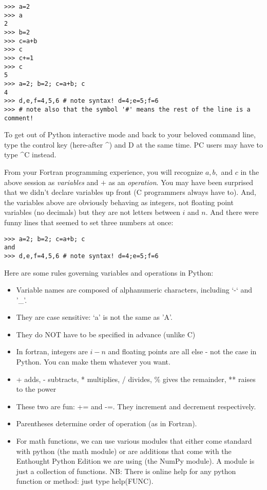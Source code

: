 {\singlespacing \color{blue} \begin{verbatim}
>>> a=2 
>>> a
2
>>> b=2
>>> c=a+b
>>> c
>>> c+=1
>>> c
5
>>> a=2; b=2; c=a+b; c
4
>>> d,e,f=4,5,6 # note syntax! d=4;e=5;f=6
>>> # note also that the symbol '#' means the rest of the line is a comment!
\end{verbatim}}

To get out of Python interactive mode and back to your beloved command line, type the control key (here-after  {\color{blue}\^{ }}) and  {\color{blue}D} at the same time.  PC users may have to type {\color{blue} \^{ }C} instead. 

From your Fortran programming experience, you will recognize $a, b,$ and $c$ in the above session as {\it variables} and $+$ as an {\it operation}. You may have been surprised that we didn't declare variables up front (C programmers always have to).  And, the variables above are obviously behaving as integers, not floating point variables (no decimals) but they are not letters between $i$ and $n$.  And there were funny lines that seemed to set three numbers at once:

{\singlespacing \color{blue} \begin{verbatim}
>>> a=2; b=2; c=a+b; c
and
>>> d,e,f=4,5,6 # note syntax! d=4;e=5;f=6
\end{verbatim}}
\noindent
Here are some rules governing variables and operations in Python:


\begin{itemize}
\item Variable names are composed of alphanumeric characters, including `-` and '\_'.
\item They are case sensitive:  `a' is not the same as 'A'.
\item They do NOT have to be specified in advance (unlike C)
\item In fortran, integers are  $i-n$ and floating points are all else - not the case in Python. You can make them whatever you want.  
\item + adds, - subtracts, * multiplies, / divides, \% gives the remainder, ** raises to the power
\item These two are fun: {\color{blue}+=} and  {\color{blue}-=}.  They increment and decrement respectively. 
\item Parentheses determine order of operation (as in Fortran). 
\item  For math functions, we can use various modules that either come standard with python (the math module) or are additions that come with the Enthought Python Edition we are using (the NumPy module).  A module is just a collection of functions. NB:  There is online help for any python function or method:  just type help(FUNC). 
\end{itemize}


